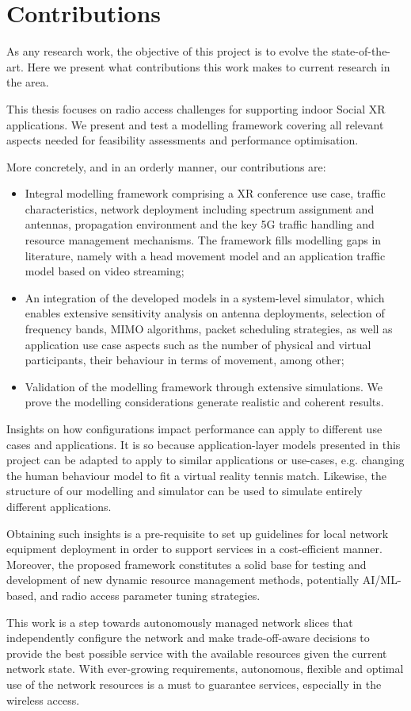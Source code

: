 \section{Contributions}
\label{sec:contributions}

As any research work, the objective of this project is to evolve the state-of-the-art. Here we present what contributions this work makes to current research in the area.

This thesis focuses on radio access challenges for supporting indoor Social XR applications. We present and test a modelling framework covering all relevant aspects needed for feasibility assessments and performance optimisation.

More concretely, and in an orderly manner, our contributions are:

\begin{itemize}
    \item Integral modelling framework comprising a XR conference use case, traffic characteristics, network deployment including spectrum assignment and antennas, propagation environment and the key 5G traffic handling and resource management mechanisms. The framework fills modelling gaps in literature, namely with a head movement model and an application traffic model based on video streaming;
    \item An integration of the developed models in a system-level simulator, which enables extensive sensitivity analysis on antenna deployments, selection of frequency bands, MIMO algorithms, packet scheduling strategies, as well as application use case aspects such as the number of physical and virtual participants, their behaviour in terms of movement, among other;
    \item Validation of the modelling framework through extensive simulations. We prove the modelling considerations generate realistic and coherent results.
\end{itemize}

Insights on how configurations impact performance can apply to different use cases and applications. It is so because application-layer models presented in this project can be adapted to apply to similar applications or use-cases, e.g. changing the human behaviour model to fit a virtual reality tennis match. Likewise, the structure of our modelling and simulator can be used to simulate entirely different applications. 

Obtaining such insights is a pre-requisite to set up guidelines for local network equipment deployment in order to support services in a cost-efficient manner. Moreover, the proposed framework constitutes a solid base for testing and development of new dynamic resource management methods, potentially \acs{AI}/\acs{ML}-based, and radio access parameter tuning strategies.

This work is a step towards autonomously managed network slices that independently configure the network and make trade-off-aware decisions to provide the best possible service with the available resources given the current network state. With ever-growing requirements, autonomous, flexible and optimal use of the network resources is a must to guarantee services, especially in the wireless access.


